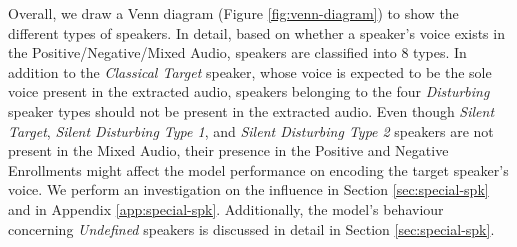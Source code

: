 Overall, we draw a Venn diagram (Figure \ref{fig:venn-diagram}) to show the different types of speakers. In detail, based on whether a speaker's voice exists in the Positive/Negative/Mixed Audio, speakers are classified into 8 types. In addition to the \textit{Classical Target} speaker, whose voice is expected to be the sole voice present in the extracted audio, speakers belonging to the four \textit{Disturbing} speaker types should not be present in the extracted audio. Even though \textit{Silent Target}, \textit{Silent Disturbing Type 1}, and \textit{Silent Disturbing Type 2} speakers are not present in the Mixed Audio, their presence in the Positive and Negative Enrollments might affect the model performance on encoding the target speaker's voice. We perform an investigation on the influence in Section \ref{sec:special-spk} and in Appendix \ref{app:special-spk}. Additionally, the model's behaviour concerning \textit{Undefined} speakers is discussed in detail in Section \ref{sec:special-spk}.











